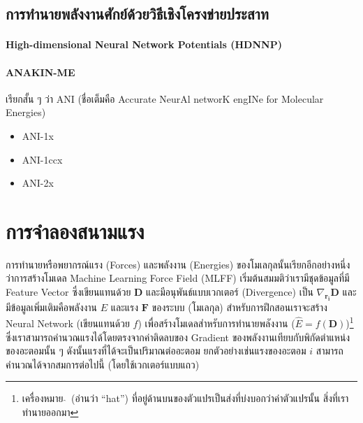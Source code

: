 \subsection{การทำนายพลังงานศักย์ด้วยวิธีเชิงโครงข่ายประสาท}
\label{ssec:pred_pot_ener_nn}

\paragraph{High-dimensional Neural Network Potentials (HDNNP)}
\autocite{behler2007}

\paragraph{ANAKIN-ME} เรียกสั้น ๆ ว่า ANI (ชื่อเต็มคือ Accurate NeurAl networK engINe for Molecular Energies)

\begin{itemize}
    \item ANI-1x\autocite{smith2017}
    \item ANI-1ccx\autocite{smith2018}
    \item ANI-2x\autocite{smith2019}
\end{itemize}

\section{การจำลองสนามแรง}
\label{sec:model_ff}

การทำนายหรือพยากรณ์แรง (Forces) และพลังงาน (Energies) ของโมเลกุลนั้นเรียกอีกอย่างหนึ่งว่าการสร้างโมเดล Machine Learning 
Force Field (MLFF) เริ่มต้นสมมติว่าเรามีชุดข้อมูลที่มี Feature Vector ซึ่งเขียนแทนด้วย $\mathbf{D}$ และมีอนุพันธ์แบบเวกเตอร์ 
(Divergence) เป็น $\nabla_{\mathbf{r_i}} \mathbf{D}$ และมีข้อมูลเพิ่มเติมคือพลังงาน $E$ และแรง $\mathbf{F}$ ของระบบ 
(โมเลกุล) สำหรับการฝึกสอนเราจะสร้าง Neural Network (เขียนแทนด้วย $f$) เพื่อสร้างโมเดลสำหรับการทำนายพลังงาน ($\hat{E} = 
f(\mathbf{D})$)\footnote{เครื่องหมาย $\hat{}$\, (อ่านว่า \enquote{hat}) ที่อยู่ด้านบนของตัวแปรเป็นส่งที่บ่งบอกว่าค่าตัวแปรนั้น%
สิ่งที่เราทำนายออกมา} ซึ่งเราสามารถคำนวณแรงได้โดยตรงจากค่าติดลบของ Gradient ของพลังงานเทียบกับพิกัดตำแหน่งของอะตอมนั้น ๆ 
ดังนั้นแรงที่ได้จะเป็นปริมาณต่ออะตอม ยกตัวอย่างเช่นแรงของอะตอม $i$ สามารถคำนวณได้จากสมการต่อไปนี้ (โดยใช้เวกเตอร์แบบแถว)

